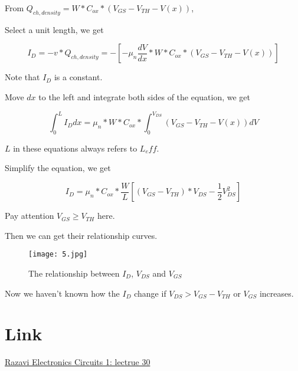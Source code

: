 \documentclass[fontset=windows]{article}
\begin{document}
From $Q_{ch,density}=W*C_{ox}*(V_{GS}-V_{TH}-V(x))$,

Select a unit length, we get

$$I_D=-v*Q_{ch,density}=-[-\mu_{n}\frac{dV}{dx}*W*C_{ox}*(V_{GS}-V_{TH}-V(x))]$$

Note that $I_D$ is a constant. 

Move $dx$ to the left and integrate both sides of the equation, we get

$$\int_{0}^{L} I_Ddx=\mu_{n}*W*C_{ox}*\int_{0}^{V_{DS}} (V_{GS}-V_{TH}-V(x))dV$$

$L$ in these equations always refers to $L_eff$.

Simplify the equation, we get

$$I_D=\mu_{n}*C_{ox}*\frac{W}{L}[(V_{GS}-V_{TH})*V_{DS}-\frac{1}{2}V_{DS}^2]$$

Pay attention $V_{GS} \geq V_{TH}$ here.

Then we can get their relationship curves.

\begin{figure}[htbp]
    \centering
    \texttt{[image: 5.jpg]}
    \captionsetup{labelformat=empty}
    \caption{The relationship between $I_D$, $V_{DS}$ and $V_{GS}$}
    \label{5}
\end{figure}

Now we haven't known how the $I_D$ change if $V_{DS}>V_{GS}-V_{TH}$ or $V_{GS}$ increases.

\section*{Link}

\href{https://www.bilibili.com/video/BV1FD4y1R7Ah?p=30&vd_source=1d0c07486a3bd3b0adb8ac548bf6453e}{Razavi Electronics Circuits 1: lectrue 30}
\end{document}
